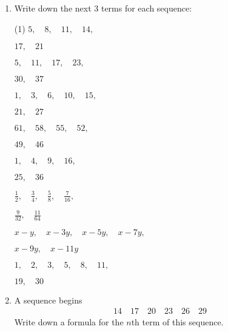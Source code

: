 \clearpage

\begin{enumerate} [leftmargin=0cm] 

\item Write down the next 3 terms for each sequence:
\begin{tasks}[label=(\alph*), after-item-skip=2pt,after-skip=3pt, label-width=4ex](1)
    \task  $ 5,  \quad 8,  \quad 11, \quad 14, \quad           $                                  \begin{envFillIn} $   17, \quad 21                         $ \end{envFillIn}
    \task  $ 5,  \quad 11,  \quad 17, \quad 23, \quad          $                                  \begin{envFillIn} $   30, \quad 37                         $ \end{envFillIn}
    \task  $ 1,  \quad 3,  \quad 6, \quad 10, \quad 15, \quad  $                                  \begin{envFillIn} $   21, \quad 27                         $ \end{envFillIn}
    \task  $ 61, \quad 58, \quad 55, \quad 52, \quad           $                                  \begin{envFillIn} $   49, \quad 46                         $ \end{envFillIn}
    \task  $ 1 , \quad 4,  \quad 9, \quad 16,  \quad           $                                  \begin{envFillIn} $   25, \quad 36                         $ \end{envFillIn}
    \task  $ \frac{1}{2} , \quad \frac{3}{4},  \quad \frac{5}{8}, \quad \frac{7}{16},  \quad   $  \begin{envFillIn} $   \frac{9}{32}, \quad \frac{11}{64}    $ \end{envFillIn}
    \task  $ x-y , \quad x-3y,  \quad x-5y, \quad x-7y,  \quad   $                                \begin{envFillIn} $   x-9y, \quad x-11y                    $ \end{envFillIn}
    \task  $ 1,  \quad 2,  \quad 3, \quad 5, \quad 8, \quad 11, \quad  $                          \begin{envFillIn} $   19, \quad 30                         $ \end{envFillIn}

\end{tasks}


\item A sequence begins
      \begin{align*}
           14  \quad 17   \quad  20  \quad  23  \quad  26  \quad  29
      \end{align*}       
    Write down a formula for the $n$th term of this sequence.       


\end{enumerate}

